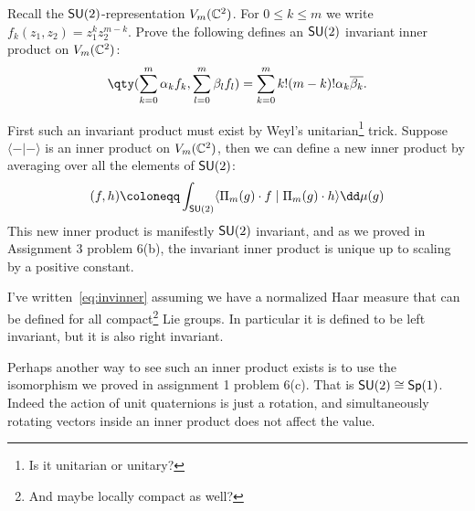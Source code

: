 \documentclass[
	pages,
	boxes,
	color=WildStrawberry
]{homework}
\theoremstyle{plain}
\begin{document}
\begin{problem}
Recall the $\mathsf{SU}(2)$-representation $V_m(\mathbb{C}^2)$. For $0\leq k \leq m$ we write $f_k(z_1, z_2) = z_1^k z_2^{m - k}$. Prove the following defines an $\mathsf{SU}(2)$ invariant inner product on $V_m(\mathbb{C}^2)$:
\begin{equation*}
	\qty(\sum_{k = 0}^m \alpha_k f_k, \sum_{l = 0}^m\beta_l f_l) = \sum_{k = 0}^m k!(m - k)!\alpha_k\overline{\beta_k}.
\end{equation*}
\end{problem}

\begin{solution}
	First such an invariant product must exist by Weyl's unitarian\footnote{Is it unitarian or unitary?} trick. Suppose $\langle-|-\rangle$ is an inner product on $V_m(\mathbb{C}^2)$, then we can define a new inner product by averaging over all the elements of $\mathsf{SU}(2)$:
	\begin{equation}\label{eq:invinner}
		(f, h) \defeq \int_{\SU{2}}\langle\Pi_m(g)\cdot f \mid \Pi_m(g)\cdot h \rangle \dd\mu(g)
	\end{equation}
	This new inner product is manifestly $\mathsf{SU}(2)$ invariant, and as we proved in Assignment 3 problem 6(b), the invariant inner product is unique up to scaling by a positive constant.

	I've written~\cref{eq:invinner} assuming we have a normalized Haar measure that can be defined for all compact\footnote{And maybe locally compact as well?} Lie groups. In particular it is defined to be left invariant, but it is also right invariant.

	Perhaps another way to see such an inner product exists is to use the isomorphism we proved in assignment 1 problem 6(c). That is $\mathsf{SU}(2)\cong\mathsf{Sp}(1)$. Indeed the action of unit quaternions is just a rotation, and simultaneously rotating vectors inside an inner product does not affect the value.


\end{solution}
\end{document}
